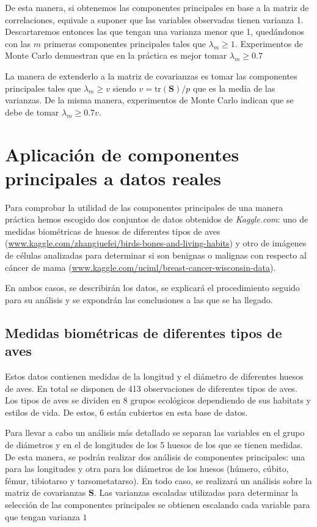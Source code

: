 \documentclass[tfg,cienciasbased,lot,lof,covers,final,overleaf,nocopyright]{tfgtfmthesisuam}
\begin{document}
De esta manera, si obtenemos las componentes principales en base a la matriz de correlaciones, equivale a suponer que las variables observadas tienen varianza 1. Descartaremos entonces las que tengan una varianza menor que 1, quedándonos con las $m$ primeras componentes principales tales que $\lambda_m \geq 1$. Experimentos de Monte Carlo demuestran que en la práctica es mejor tomar $\lambda_m \geq 0\mbox{.}7$

La manera de extenderlo a la matriz de covarianzas es tomar las componentes principales tales que $\lambda_m \geq v$ siendo $v = \mbox{tr}(\mathbf{S})/p$ que es la media de las varianzas. De la misma manera, experimentos de Monte Carlo indican que se debe de tomar $\lambda_m \geq 0\mbox{.}7v$.

\section{Aplicación de componentes principales a datos reales}
Para comprobar la utilidad de las componentes principales de una manera práctica hemos escogido dos conjuntos de datos obtenidos de \textit{Kaggle.com}: uno de medidas biométricas de huesos de diferentes tipos de aves (\url{www.kaggle.com/zhangjuefei/birds-bones-and-living-habits}) y otro de imágenes de células analizadas para determinar si son benignas o malignas con respecto al cáncer de mama (\url{www.kaggle.com/uciml/breast-cancer-wisconsin-data}).

En ambos casos, se describirán los datos, se explicará el procedimiento seguido para su análisis y se expondrán las conclusiones a las que se ha llegado.

\subsection{Medidas biométricas de diferentes tipos de aves}

Estos datos contienen medidas de la longitud y el diámetro de diferentes huesos de aves. En total se disponen de 413 observaciones de diferentes tipos de aves. Los tipos de aves se dividen en 8 grupos ecológicos dependiendo de sus habitats y estilos de vida. De estos, 6 están cubiertos en esta base de datos.

Para llevar a cabo un análisis más detallado se separan las variables en el grupo de diámetros y en el de longitudes de los 5 huesos de los que se tienen medidas. De esta manera, se podrán realizar dos análisis de componentes principales: una para las longitudes y otra para los diámetros de los huesos (húmero, cúbito, fémur, tibiotarso y tarsometatarso). En todo caso, se realizará un análisis sobre la matriz de covarianzas $\mathbf{S}$. Las varianzas escaladas utilizadas para determinar la selección de las componentes principales se obtienen escalando cada variable para que tengan varianza $1$
\end{document}
